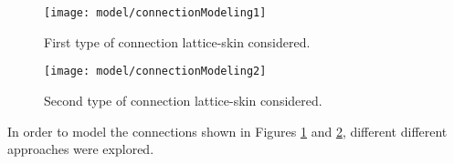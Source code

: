 \begin{figure}[!htpb]
  \centering
  \texttt{[image: model/connectionModeling1]}
  \caption[First type of connection lattice-skin considered]{First type of connection lattice-skin considered. }\label{fig:connectionModeling1}
\end{figure}

\begin{figure}[!htpb]
  \centering
  \texttt{[image: model/connectionModeling2]}
  \caption[Second type of connection lattice-skin considered]{Second type of connection lattice-skin considered. }\label{fig:connectionModeling2}
\end{figure}

In order to model the connections shown in Figures \ref{fig:connectionModeling1} and \ref{fig:connectionModeling2}, different different approaches were explored. 

\subsubsection{}